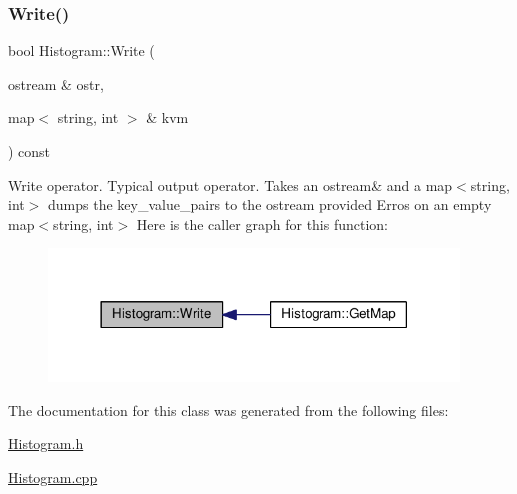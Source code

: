 \subsubsection{\texorpdfstring{Write()}{Write()}}
{\footnotesize\ttfamily bool Histogram\+::\+Write (\begin{DoxyParamCaption}\item[{ostream \&}]{ostr,  }\item[{map$<$ string, int $>$ \&}]{kvm }\end{DoxyParamCaption}) const}

Write operator. Typical output operator. Takes an ostream\& and a map$<$string, int$>$ dumps the key\+\_\+value\+\_\+pairs to the ostream provided Erros on an empty map$<$string, int$>$ Here is the caller graph for this function\+:
\nopagebreak
\begin{figure}[H]
\begin{center}
\leavevmode
\includegraphics[width=309pt]{class_histogram_af8b644d9dcb8dd86fb3420640de72ab2_icgraph}
\end{center}
\end{figure}


The documentation for this class was generated from the following files\+:\begin{DoxyCompactItemize}
\item 
\hyperlink{_histogram_8h}{Histogram.\+h}\item 
\hyperlink{_histogram_8cpp}{Histogram.\+cpp}\end{DoxyCompactItemize}
